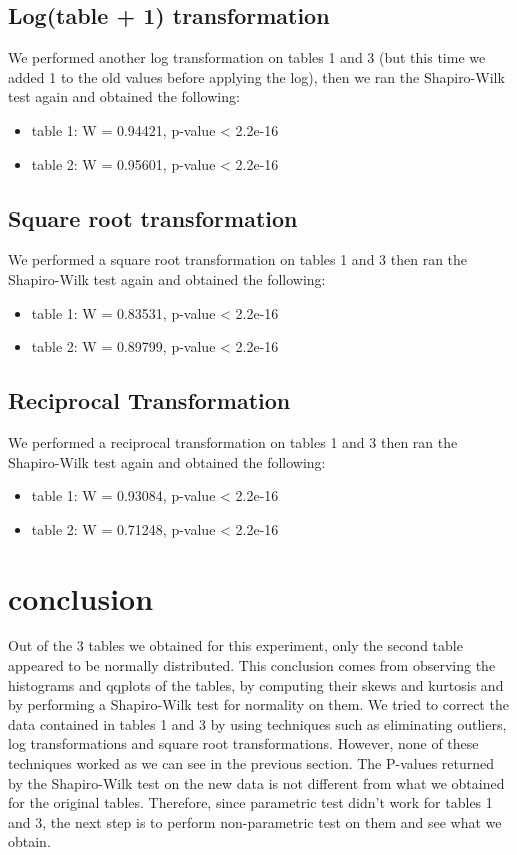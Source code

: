 \documentclass[12pt]{article}
\begin{document}
			\subsection{Log(table + 1) transformation}
				We performed another log transformation on tables 1 and 3 (but this time we added 1 to the old values before applying the log), then we ran the Shapiro-Wilk test again and obtained the following:
				\begin{itemize}
					\item table 1: W = 0.94421, p-value \textless{}  2.2e-16
					\item table 2: W = 0.95601, p-value \textless{}  2.2e-16
				\end{itemize} 
			\subsection{Square root transformation}
				We performed a square root transformation on tables 1 and 3 then  ran the Shapiro-Wilk test again and obtained the following:
				\begin{itemize}
					\item table 1: W = 0.83531, p-value \textless{}  2.2e-16
					\item table 2: W = 0.89799, p-value \textless{}  2.2e-16
				\end{itemize} 
			\subsection{Reciprocal Transformation}
				We performed a reciprocal transformation on tables 1 and 3 then ran the Shapiro-Wilk test again and obtained the following:
				\begin{itemize}
					\item table 1: W = 0.93084, p-value \textless{}  2.2e-16
					\item table 2: W = 0.71248, p-value \textless{}  2.2e-16
				\end{itemize} 
		\section{conclusion}
			Out of the 3 tables we obtained for this experiment, only the second table appeared to be normally distributed. This conclusion comes from observing the histograms and qqplots of the tables, by computing their skews and kurtosis and by performing a Shapiro-Wilk test for normality on them. We tried to correct the data contained in tables 1 and 3 by using techniques such as eliminating outliers, log transformations and square root transformations. However, none of these techniques worked as we can see in the previous section. The P-values returned by the Shapiro-Wilk test on the new data is not different from what we obtained for the original tables. Therefore, since parametric test didn't work for tables 1 and 3, the next step is to perform non-parametric test on them and see what we obtain. 
\end{document}
